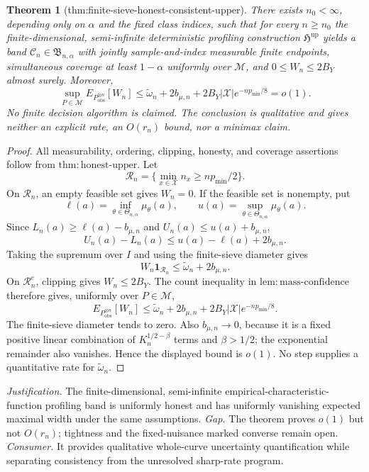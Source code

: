\documentclass{article}
\newtheorem{theorem}{Theorem}
\begin{document}
\begin{theorem}[thm:finite-sieve-honest-consistent-upper]\label{thm:finite-sieve-honest-consistent-upper}
There exists \(n_0<\infty\), depending only on \(\alpha\) and the fixed class indices, such that for every \(n\ge n_0\) the finite-dimensional, semi-infinite deterministic profiling construction \(\mathfrak H^{\mathrm{up}}\) yields a band \(\mathcal C_n\in\mathfrak B_{n,\alpha}\) with jointly sample-and-index measurable finite endpoints, simultaneous coverage at least \(1-\alpha\) uniformly over \(\mathcal M\), and \(0\le W_n\le2B_Y\) almost surely. Moreover,
\[
 \sup_{P\in\mathcal M}E_{P_{\mathrm{obs}}^{\otimes n}}[W_n]
 \le \widetilde\omega_n+2b_{\mu,n}
   +2B_Y|\mathcal X|e^{-np_{\min}/8}=o(1).
\]
No finite decision algorithm is claimed. The conclusion is qualitative and gives neither an explicit rate, an \(O(r_n)\) bound, nor a minimax claim.
\end{theorem}
\begin{proof}
All measurability, ordering, clipping, honesty, and coverage assertions follow from \(\mathrm{thm{:}honest\text{-}upper}\). Let
\[
 \mathcal R_n=\{\min_{x\in\mathcal X}n_x\ge np_{\min}/2\}.
\]
On \(\mathcal R_n\), an empty feasible set gives \(W_n=0\). If the feasible set is nonempty, put
\[
 \ell(a)=\inf_{\theta\in\Theta_{n,\alpha}}\mu_\theta(a),
 \qquad
 u(a)=\sup_{\theta\in\Theta_{n,\alpha}}\mu_\theta(a).
\]
Since \(L_n(a)\ge\ell(a)-b_{\mu,n}\) and \(U_n(a)\le u(a)+b_{\mu,n}\),
\[
 U_n(a)-L_n(a)\le u(a)-\ell(a)+2b_{\mu,n}.
\]
Taking the supremum over \(I\) and using the finite-sieve diameter gives
\[
 W_n\mathbf1_{\mathcal R_n}\le\widetilde\omega_n+2b_{\mu,n}.
\]
On \(\mathcal R_n^c\), clipping gives \(W_n\le2B_Y\). The count inequality in \(\mathrm{lem{:}mass\text{-}confidence}\) therefore gives, uniformly over \(P\in\mathcal M\),
\[
 E_{P_{\mathrm{obs}}^{\otimes n}}[W_n]
 \le\widetilde\omega_n+2b_{\mu,n}
   +2B_Y|\mathcal X|e^{-np_{\min}/8}.
\]
The finite-sieve diameter tends to zero. Also \(b_{\mu,n}\to0\), because it is a fixed positive linear combination of \(K_n^{1/2-\beta}\) terms and \(\beta>1/2\); the exponential remainder also vanishes. Hence the displayed bound is \(o(1)\). No step supplies a quantitative rate for \(\widetilde\omega_n\).
\end{proof}
\par\smallskip\noindent \textit{Justification.} The finite-dimensional, semi-infinite empirical-characteristic-function profiling band is uniformly honest and has uniformly vanishing expected maximal width under the same assumptions. \textit{Gap.} The theorem proves \(o(1)\) but not \(O(r_n)\); tightness and the fixed-nuisance marked converse remain open. \textit{Consumer.} It provides qualitative whole-curve uncertainty quantification while separating consistency from the unresolved sharp-rate program.
\end{document}
